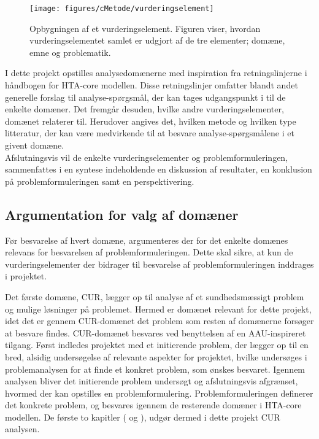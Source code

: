 \begin{figure}[H] 
\begin{center}
\texttt{[image: figures/cMetode/vurderingselement]}
\end{center}
\caption{Opbygningen af et vurderingselement. Figuren viser, hvordan vurderingselementet samlet er udgjort af de tre elementer; domæne, emne og problematik.}
\label{fig:vurderingselement} 
\end{figure}

I dette projekt opstilles analysedomænerne med inspiration fra retningslinjerne i håndbogen for HTA-core modellen. Disse retningslinjer omfatter blandt andet generelle forslag til analyse-spørgsmål, der kan tages udgangspunkt i til de enkelte domæner. Det fremgår desuden, hvilke andre vurderingselementer, domænet relaterer til. Herudover angives det, hvilken metode og hvilken type litteratur, der kan være medvirkende til at besvare analyse-spørgsmålene i et givent domæne. \citep{HTAcore} \\
Afslutningsvis vil de enkelte vurderingselementer og problemformuleringen, sammenfattes i en syntese indeholdende en diskussion af resultater, en konklusion på problemformuleringen samt en perspektivering. 

\subsection{Argumentation for valg af domæner}
Før besvarelse af hvert domæne, argumenteres der for det enkelte domænes relevans for besvarelsen af problemformuleringen. Dette skal sikre, at kun de vurderingselementer der bidrager til besvarelse af problemformuleringen inddrages i projektet. 

Det første domæne, CUR, lægger op til analyse af et sundhedsmæssigt problem og mulige løsninger på problemet. Hermed er domænet relevant for dette projekt, idet det er gennem CUR-domænet det problem som resten af domænerne forsøger at besvare findes. CUR-domænet besvares ved benyttelsen af en AAU-inspireret tilgang. Først indledes projektet med et initierende problem, der lægger op til en bred, alsidig undersøgelse af relevante aspekter for projektet, hvilke undersøges i problemanalysen for at finde et konkret problem, som ønskes besvaret. Igennem analysen bliver det initierende problem undersøgt og afslutningsvis afgrænset, hvormed der kan opstilles en problemformulering. Problemformuleringen definerer det konkrete problem, og besvares igennem de resterende domæner i HTA-core modellen. De første to kapitler ( og ), udgør dermed i dette projekt CUR analysen. 

